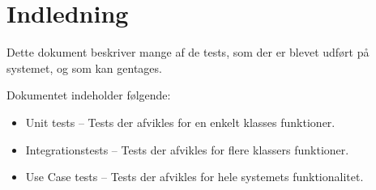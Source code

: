 \documentclass[Main]{Subfiles}
\begin{document}
\chapter{Indledning}

Dette dokument beskriver mange af de tests, som der er blevet udført på systemet, og som kan gentages.

Dokumentet indeholder følgende:

\begin{itemize}
\item Unit tests -- Tests der afvikles for en enkelt klasses funktioner.
\item Integrationstests -- Tests der afvikles for flere klassers funktioner.
\item Use Case tests -- Tests der afvikles for hele systemets funktionalitet.
\end{itemize}
\end{document}

